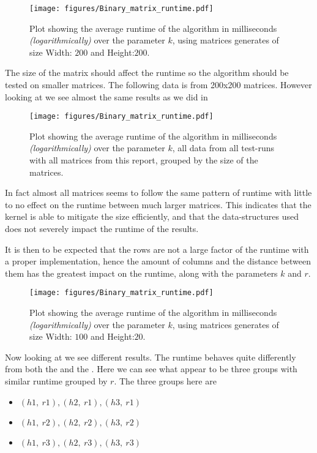 \documentclass[a4paper]{article}
\begin{document}
\begin{figure}[!ht]
    \centering
    \texttt{[image: figures/Binary\_matrix\_runtime.pdf]}
    \caption{Plot showing the average runtime of the algorithm in milliseconds \textit{(logarithmically)}
        over the parameter $k$, using matrices generates of size Width: $200$ and Height:$200$.}
    \label{fig:res-200x200k}
\end{figure}

The size of the matrix should affect the runtime so the algorithm should be tested on smaller matrices. The
following data is from 200x200 matrices. However looking at  we see almost the same
results as we did in 

\begin{figure}[!ht]
    \centering
    \texttt{[image: figures/Binary\_matrix\_runtime.pdf]}
    \caption{Plot showing the average runtime of the algorithm in milliseconds \textit{(logarithmically)}
        over the parameter $k$, all data from all test-runs with all matrices from this report, grouped by
        the size of the matrices.}
    \label{fig:res-all-matrices-over-k}
\end{figure}

In fact almost all matrices seems to follow the same pattern of runtime with little to no effect on the runtime
between much larger matrices. This indicates that the kernel is able to mitigate the size efficiently, and that
the data-structures used does not severely impact the runtime of the results.

It is then to be expected that the rows are not a large factor of the runtime with a proper implementation,
hence the amount of columns and the distance between them has the greatest impact on the runtime, along
with the parameters $k$ and $r$.

\begin{figure}[H]
    \centering
    \texttt{[image: figures/Binary\_matrix\_runtime.pdf]}
    \caption{Plot showing the average runtime of the algorithm in milliseconds \textit{(logarithmically)}
        over the parameter $k$, using matrices generates of size Width: $100$ and Height:$20$.}
    \label{fig:res-100x20k}
\end{figure}

Now looking at  we see different results. The runtime behaves quite differently from
both the  and the . Here we can see what appear to be
three groups with similar runtime grouped by $r$. The three groups here are
\begin{itemize}
    \item $(h1,~r1),(h2,~r1),(h3,~r1)$
    \item $(h1,~r2),(h2,~r2),(h3,~r2)$
    \item $(h1,~r3),(h2,~r3),(h3,~r3)$
\end{itemize}
\end{document}
